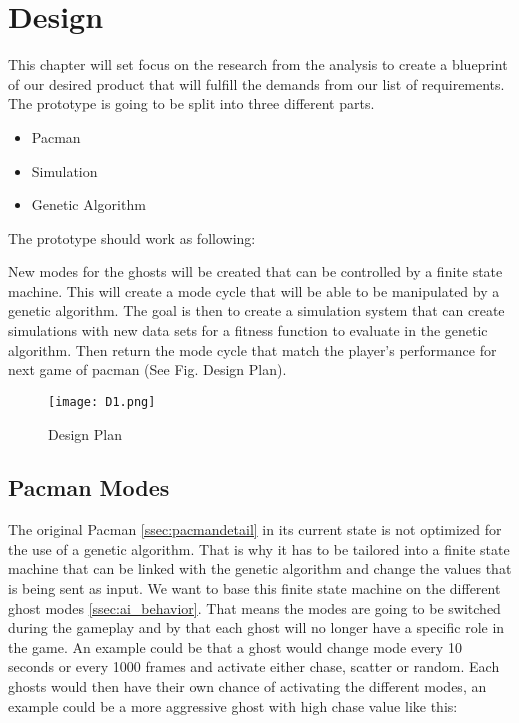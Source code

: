 \section{Design} \label{sec:design}

This chapter will set focus on the research from the analysis to create a blueprint of our desired product that will fulfill the demands from our list of requirements. The prototype is going to be split into three different parts.

\begin{itemize}
\item Pacman
\item Simulation
\item Genetic Algorithm
\end{itemize}

The prototype should work as following:

New modes for the ghosts will be created that can be controlled by a finite state machine. This will create a mode cycle that will be able to be manipulated by a genetic algorithm. The goal is then to create a simulation system that can create simulations with new data sets for a fitness function to evaluate in the genetic algorithm. Then return the mode cycle that match the player’s performance for next game of pacman (See Fig. Design Plan).


\begin{figure}[!htbp]
\centering
\texttt{[image: D1.png]}
\caption{ Design Plan }
\label{fig:DesignPlan}
\end{figure}

\subsection{Pacman Modes}\label{ssec:design_modes}

The original Pacman \ref{ssec:pacmandetail} in its current state is not optimized for the use of a genetic algorithm. That is why it has to be tailored into a finite state machine that can be linked with the genetic algorithm and change the values that is being sent as input. We want to base this finite state machine on the different ghost modes \ref{ssec:ai_behavior}. That means the modes are going to be switched during the gameplay and by that each ghost will no longer have a specific role in the game. An example could be that a ghost would change mode every 10 seconds or every 1000 frames and activate either chase, scatter or random. Each ghosts would then have their own chance of activating the different modes, an example could be a more aggressive ghost with high chase value like this:



